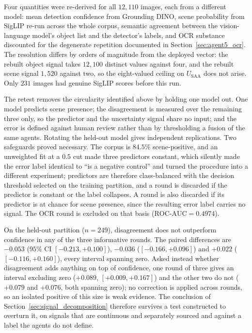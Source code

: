 \documentclass[12pt,a4paper]{report}
\begin{document}
Four quantities were re-derived for all $12{,}110$ images, each from a different model: mean detection confidence from Grounding DINO, scene probability from SigLIP re-run across the whole corpus, semantic agreement between the vision-language model's object list and the detector's labels, and OCR substance discounted for the degenerate repetition documented in Section~\ref{sec:agent5_ocr}. The resolution differs by orders of magnitude from the deployed vector: the rebuilt object signal takes $12{,}100$ distinct values against four, and the rebuilt scene signal $1{,}520$ against two, so the eight-valued ceiling on $U_{\text{SAA}}$ does not arise. Only $231$ images had genuine SigLIP scores before this run.

The retest removes the circularity identified above by holding one model out. One model predicts scene presence; the disagreement is measured over the remaining three only, so the predictor and the uncertainty signal share no input; and the error is defined against human review rather than by thresholding a fusion of the same agents. Rotating the held-out model gives independent replications. Two safeguards proved necessary. The corpus is $84.5\%$ scene-positive, and an unweighted fit at a $0.5$ cut made three predictors constant, which silently made the error label identical to ``is a negative control'' and turned the procedure into a different experiment; predictors are therefore class-balanced with the decision threshold selected on the training partition, and a round is discarded if the predictor is constant or the label collapses. A round is also discarded if its predictor is at chance for scene presence, since the resulting error label carries no signal. The OCR round is excluded on that basis ($\text{ROC-AUC}=0.4974$).

On the held-out partition ($n=249$), disagreement does not outperform confidence in any of the three informative rounds. The paired differences are $-0.053$ ($95\%$ CI $[-0.213, +0.100]$), $-0.036$ ($[-0.166, +0.096]$) and $+0.022$ ($[-0.116, +0.160]$), every interval spanning zero. Asked instead whether disagreement adds anything on top of confidence, one round of three gives an interval excluding zero ($+0.089$, $[+0.009, +0.167]$) and the other two do not ($+0.079$ and $+0.076$, both spanning zero); no correction is applied across rounds, so an isolated positive of this size is weak evidence. The conclusion of Section~\ref{sec:signal_decomposition} therefore survives a test constructed to overturn it, on signals that are continuous and separately sourced and against a label the agents do not define.
\end{document}
